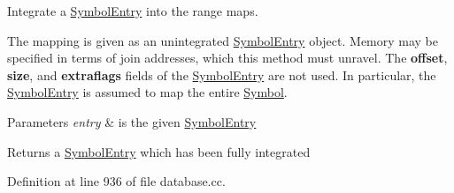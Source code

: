 Integrate a \mbox{\hyperlink{class_symbol_entry}{Symbol\+Entry}} into the range maps. 

The mapping is given as an unintegrated \mbox{\hyperlink{class_symbol_entry}{Symbol\+Entry}} object. Memory may be specified in terms of join addresses, which this method must unravel. The {\bfseries{offset}}, {\bfseries{size}}, and {\bfseries{extraflags}} fields of the \mbox{\hyperlink{class_symbol_entry}{Symbol\+Entry}} are not used. In particular, the \mbox{\hyperlink{class_symbol_entry}{Symbol\+Entry}} is assumed to map the entire \mbox{\hyperlink{class_symbol}{Symbol}}. 
\begin{DoxyParams}{Parameters}
{\em entry} & is the given \mbox{\hyperlink{class_symbol_entry}{Symbol\+Entry}} \\
\hline
\end{DoxyParams}
\begin{DoxyReturn}{Returns}
a \mbox{\hyperlink{class_symbol_entry}{Symbol\+Entry}} which has been fully integrated 
\end{DoxyReturn}


Definition at line 936 of file database.\+cc.

